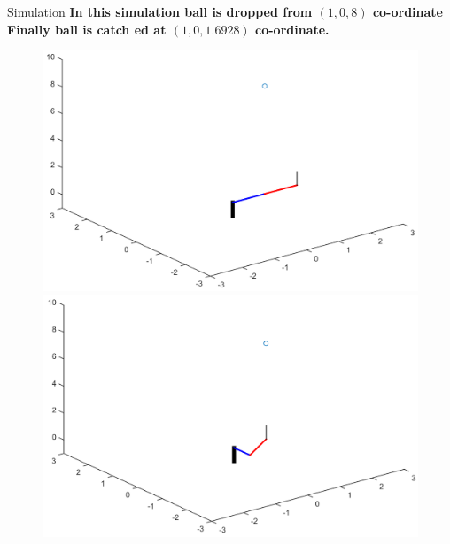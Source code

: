 \documentclass[a4paper,11pt]{article}
\begin{document}
\begin{section}{Simulation}
\textbf{In this simulation ball is dropped from $(1,0,8)$ co-ordinate}\\
\textbf{Finally ball is catch ed at $(1,0,1.6928)$ co-ordinate.}\\
\vspace{10mm}
\begin{figure}[!htb]
   \begin{minipage}{0.4\textwidth}
     \centering
     \includegraphics[width=1.25\linewidth]{FIG1.png}
   \end{minipage}\hfill
   \begin{minipage}{0.4\textwidth}
     \centering
     \includegraphics[width=1.25\linewidth]{FIG2.png}
   \end{minipage}
\end{figure}
\vspace{10mm}
\begin{figure}[!htb]

\end{figure}
\end{section}
\end{document}
